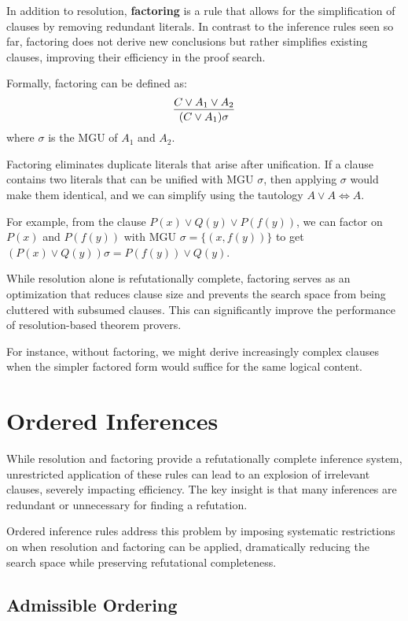 In addition to resolution, \textbf{factoring} is a rule that allows for the simplification of clauses by removing redundant literals.
In contrast to the inference rules seen so far, factoring does not derive new conclusions but rather simplifies existing clauses, improving their efficiency in the proof search.

Formally, factoring can be defined as:
\begin{equation}
  \infer{(C \lor A_1)\sigma}{C \lor A_1 \lor A_2}
\end{equation}
\indent where \(\sigma\) is the MGU of \(A_1\) and \(A_2\).

\noindent Factoring eliminates duplicate literals that arise after unification. If a clause contains two literals that can be unified with MGU \(\sigma\), then applying \(\sigma\) would make them identical, and we can simplify using the tautology \(A \lor A \iff A\).

For example, from the clause \(P(x) \lor Q(y) \lor P(f(y))\), we can factor on \(P(x)\) and \(P(f(y))\) with MGU \(\sigma = \{(x , f(y))\}\) to get \((P(x) \lor Q(y))\sigma = P(f(y)) \lor Q(y)\).

While resolution alone is refutationally complete, factoring serves as an optimization that reduces clause size and prevents the search space from being cluttered with subsumed clauses. This can significantly improve the performance of resolution-based theorem provers.

For instance, without factoring, we might derive increasingly complex clauses when the simpler factored form would suffice for the same logical content.

\section{Ordered Inferences}

While resolution and factoring provide a refutationally complete inference system, unrestricted application of these rules can lead to an explosion of irrelevant clauses, severely impacting efficiency. The key insight is that many inferences are redundant or unnecessary for finding a refutation.

Ordered inference rules address this problem by imposing systematic restrictions on when resolution and factoring can be applied, dramatically reducing the search space while preserving refutational completeness.

\subsection{Admissible Ordering}

